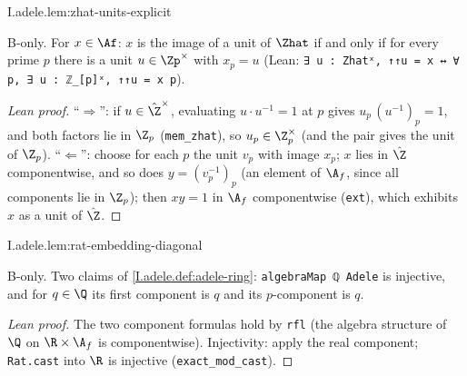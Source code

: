 \begin{lemma}
\bonly
{}
\end{lemma}
\begin{tfformal}{I.adele.lem:zhat-units-explicit}
\begin{tffidelity}
B-only. For $x\in\Af$: $x$ is the image of a unit of $\Zhat$ if and only if for every prime $p$ there is a unit $u\in\Zp^\times$ with $x_p=u$ (Lean: \texttt{∃ u : Zhatˣ, ↑↑u = x ↔ ∀ p, ∃ u : ℤ\_[p]ˣ, ↑↑u = x p}).
\end{tffidelity}
\end{tfformal}
\begin{proof}[Lean proof]
``$\Rightarrow$'': if $u\in\hat\Z^\times$, evaluating $u\cdot u^{-1}=1$ at $p$ gives $u_p\,(u^{-1})_p=1$, and both factors lie in $\Z_p$ (\texttt{mem\_zhat}), so $u_p\in\Z_p^\times$ (and the pair gives the unit of $\Z_p$). ``$\Leftarrow$'': choose for each $p$ the unit $v_p$ with image $x_p$; $x$ lies in $\hat\Z$ componentwise, and so does $y=(v_p^{-1})_p$ (an element of $\A_f$, since all components lie in $\Z_p$); then $xy=1$ in $\A_f$ componentwise (\texttt{ext}), which exhibits $x$ as a unit of $\hat\Z$.
\end{proof}

\begin{lemma}
\bonly
{}
\end{lemma}
\begin{tfformal}{I.adele.lem:rat-embedding-diagonal}
\begin{tffidelity}
B-only. Two claims of \cref{I.adele.def:adele-ring}: \texttt{algebraMap ℚ Adele} is injective, and for $q\in\Q$ its first component is $q$ and its $p$-component is $q$.
\end{tffidelity}
\end{tfformal}
\begin{proof}[Lean proof]
The two component formulas hold by \texttt{rfl} (the algebra structure of $\Q$ on $\R\times\A_f$ is componentwise). Injectivity: apply the real component; \texttt{Rat.cast} into $\R$ is injective (\texttt{exact\_mod\_cast}).
\end{proof}

